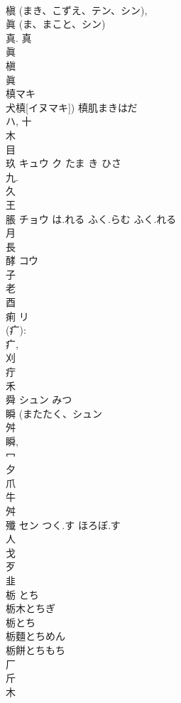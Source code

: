\documentclass[8pt]{extreport}
\begin{document}
\begin{CJK}{UTF8}{min}
\\	槇 (まき、こずえ、テン、シン), 
\\	眞 (ま、まこと、シン) 
\\	真. 真 
\\	眞 
\\	槇 
\\	眞 
\\	槙マキ 
\\	犬槙[イヌマキ]) 槙肌まきはだ 
\\	ハ, 十 
\\	木 
\\	目 
\\	玖	キュウ ク	たま き ひさ	
\\	九.	
\\	久 
\\	王 
\\	脹	チョウ	は.れる ふく.らむ ふく.れる	
\\	月 
\\	長 
\\	酵	コウ		
\\	子 
\\	老 
\\	酉 
\\	痢	リ		
\\	(疒): 
\\	疒, 
\\	刈 
\\	疔 
\\	禾 
\\	舜	シュン	みつ	
\\	瞬 (またたく、シュン 
\\	舛 
\\	瞬, 
\\	冖 
\\	夕 
\\	爪 
\\	牛 
\\	舛 
\\	殲	セン	つく.す ほろぼ.す	
\\	人 
\\	戈 
\\	歹 
\\	韭 
\\	栃		とち	
\\	栃木とちぎ 
\\	栃とち 
\\	栃麵とちめん 
\\	栃餅とちもち 
\\	厂 
\\	斤 
\\	木 

\end{CJK}
\end{document}
